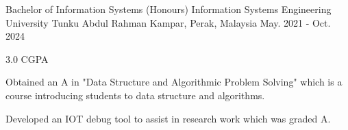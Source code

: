 

\begin{cventries}

  \cventry
    {Bachelor of Information Systems (Honours) Information Systems Engineering} %
    {University Tunku Abdul Rahman} %
    {Kampar, Perak, Malaysia} %
    {May. 2021 - Oct. 2024} %
    {
      \begin{cvitems} %
        \item {3.0 CGPA}
        \item {Obtained an A in "Data Structure and Algorithmic Problem Solving" which is a course introducing students to data structure and algorithms.}
        \item {Developed an IOT debug tool to assist in research work which was graded A.}
      \end{cvitems}
    }
\end{cventries}
